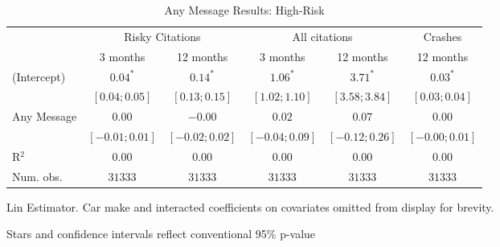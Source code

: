 
\begin{table}
\caption{Any Message Results: High-Risk}
\begin{center}
\begin{threeparttable}
\begin{tabular}{l c c c c c}
\hline
 & \multicolumn{2}{c}{Risky Citations} & \multicolumn{2}{c}{All citations} & \multicolumn{1}{c}{Crashes} \\
\cline{2-3} \cline{4-5} \cline{6-6}
 & 3 months & 12 months & 3 months & 12 months & 12 months \\
\hline
(Intercept) & $0.04^{*}$       & $0.14^{*}$       & $1.06^{*}$       & $3.71^{*}$       & $0.03^{*}$       \\
            & $ [ 0.04; 0.05]$ & $ [ 0.13; 0.15]$ & $ [ 1.02; 1.10]$ & $ [ 3.58; 3.84]$ & $ [ 0.03; 0.04]$ \\
Any Message & $0.00$           & $-0.00$          & $0.02$           & $0.07$           & $0.00$           \\
            & $ [-0.01; 0.01]$ & $ [-0.02; 0.02]$ & $ [-0.04; 0.09]$ & $ [-0.12; 0.26]$ & $ [-0.00; 0.01]$ \\
\hline
R$^2$       & $0.00$           & $0.00$           & $0.00$           & $0.00$           & $0.00$           \\
Num. obs.   & $31333$          & $31333$          & $31333$          & $31333$          & $31333$          \\
\hline
\end{tabular}
\begin{tablenotes}[flushleft]
\scriptsize{\item Lin Estimator. Car make and interacted coefficients on covariates omitted from display for brevity.
                             \item Stars and confidence intervals reflect conventional 95\% p-value}
\end{tablenotes}
\end{threeparttable}
\label{table:coefficients}
\end{center}
\end{table}
